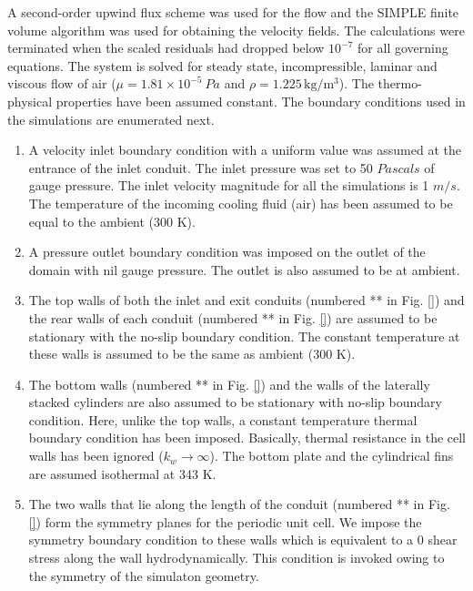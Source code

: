 \documentclass[twocolumn,10pt,cleanfoot]{ihmtc}
\begin{document}
%
A second-order upwind flux scheme was used for the flow and the SIMPLE finite volume algorithm was used for obtaining the velocity fields. The calculations were terminated when the scaled residuals had dropped below ${{10}^{-7}}$ for all governing equations. The system is solved for steady state, incompressible, laminar and viscous flow of air ($\mu =1.81\times {{10}^{-5}}~Pa$ and $\rho =1.225\,\text{kg/}{{\text{m}}^{3}}$). The thermo-physical properties have been assumed constant. 
%
The boundary conditions used in the simulations are enumerated next.
\begin{enumerate}     
\item {A velocity inlet boundary condition with a uniform value was assumed at the entrance of the inlet conduit. The inlet pressure was set to 50 $Pascals$ of gauge pressure. The inlet velocity magnitude for all the simulations is 1 $m/s$. The temperature of the incoming cooling fluid (air) has been assumed to be equal to the ambient (300 K).}
%         
\item{A pressure outlet boundary condition was imposed on the outlet of the domain with nil gauge pressure. The outlet is also assumed to be at ambient.}
%         
\item{The top walls of both the inlet and exit conduits (numbered ** in Fig. \ref{}) and the rear walls of each conduit (numbered ** in Fig. \ref{}) are assumed to be stationary with the no-slip boundary condition. The constant temperature at these walls is assumed to be the same as ambient (300 K). }
%
\item{The bottom walls (numbered ** in Fig. \ref{}) and the walls of the laterally stacked cylinders are also assumed to be stationary with no-slip boundary condition. Here, unlike the top walls, a constant temperature thermal boundary condition has been imposed. Basically, thermal resistance in the cell walls has been ignored ($k_w \rightarrow \infty$). The bottom plate and the cylindrical fins are assumed isothermal at 343 K.}
%       
\item{The two walls that lie along the length of the conduit (numbered ** in Fig. \ref{}) form the symmetry planes for the periodic unit cell. We impose the symmetry boundary condition to these walls which is equivalent to a 0 shear stress along the wall hydrodynamically. \cite{fluent} This condition is invoked owing to the symmetry of the simulaton geometry.}      
\end{enumerate}
%
\end{document}
